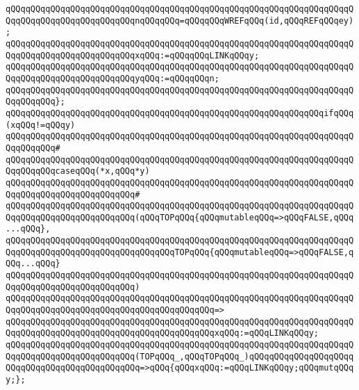 \verb|qQQqqQQqqQQqqQQqqQQqqQQqqQQqqQQqqQQqqQQqqQQqqQQqqQQqqQQqqQQqqQQqqQQqqQQqqQQqqQQqqQQqqQQqqQQqqQQqnqQQqqQQq=qQQqqQQqWREFqQQq(id,qQQqREFqQQqey);|\newline
\verb|qQQqqQQqqQQqqQQqqQQqqQQqqQQqqQQqqQQqqQQqqQQqqQQqqQQqqQQqqQQqqQQqqQQqqQQqqQQqqQQqqQQqqQQqqQQqqQQqxqQQq:=qQQqqQQqLINKqQQqy;|\newline
\verb|qQQqqQQqqQQqqQQqqQQqqQQqqQQqqQQqqQQqqQQqqQQqqQQqqQQqqQQqqQQqqQQqqQQqqQQqqQQqqQQqqQQqqQQqqQQqqQQqyqQQq:=qQQqqQQqn;|\newline
\verb|qQQqqQQqqQQqqQQqqQQqqQQqqQQqqQQqqQQqqQQqqQQqqQQqqQQqqQQqqQQqqQQqqQQqqQQqqQQqqQQq};|\newline
\newline
\verb|qQQqqQQqqQQqqQQqqQQqqQQqqQQqqQQqqQQqqQQqqQQqqQQqqQQqqQQqqQQqqQQqifqQQq(xqQQq!=qQQqy)|\newline
\verb|qQQqqQQqqQQqqQQqqQQqqQQqqQQqqQQqqQQqqQQqqQQqqQQqqQQqqQQqqQQqqQQqqQQqqQQqqQQqqQQq#|\newline
\verb|qQQqqQQqqQQqqQQqqQQqqQQqqQQqqQQqqQQqqQQqqQQqqQQqqQQqqQQqqQQqqQQqqQQqqQQqqQQqqQQqcaseqQQq(*x,qQQq*y)|\newline
\verb|qQQqqQQqqQQqqQQqqQQqqQQqqQQqqQQqqQQqqQQqqQQqqQQqqQQqqQQqqQQqqQQqqQQqqQQqqQQqqQQqqQQqqQQqqQQqqQQq#|\newline
\verb|qQQqqQQqqQQqqQQqqQQqqQQqqQQqqQQqqQQqqQQqqQQqqQQqqQQqqQQqqQQqqQQqqQQqqQQqqQQqqQQqqQQqqQQqqQQqqQQq(qQQqTOPqQQq{qQQqmutableqQQq=>qQQqFALSE,qQQq...qQQq},|\newline
\verb|qQQqqQQqqQQqqQQqqQQqqQQqqQQqqQQqqQQqqQQqqQQqqQQqqQQqqQQqqQQqqQQqqQQqqQQqqQQqqQQqqQQqqQQqqQQqqQQqqQQqqQQqTOPqQQq{qQQqmutableqQQq=>qQQqFALSE,qQQq...qQQq}|\newline
\verb|qQQqqQQqqQQqqQQqqQQqqQQqqQQqqQQqqQQqqQQqqQQqqQQqqQQqqQQqqQQqqQQqqQQqqQQqqQQqqQQqqQQqqQQqqQQqqQQq)|\newline
\verb|qQQqqQQqqQQqqQQqqQQqqQQqqQQqqQQqqQQqqQQqqQQqqQQqqQQqqQQqqQQqqQQqqQQqqQQqqQQqqQQqqQQqqQQqqQQqqQQqqQQqqQQqqQQqqQQq=>|\newline
\verb|qQQqqQQqqQQqqQQqqQQqqQQqqQQqqQQqqQQqqQQqqQQqqQQqqQQqqQQqqQQqqQQqqQQqqQQqqQQqqQQqqQQqqQQqqQQqqQQqqQQqqQQqqQQqqQQqxqQQq:=qQQqLINKqQQqy;|\newline
\newline
\verb|qQQqqQQqqQQqqQQqqQQqqQQqqQQqqQQqqQQqqQQqqQQqqQQqqQQqqQQqqQQqqQQqqQQqqQQqqQQqqQQqqQQqqQQqqQQqqQQq(TOPqQQq_,qQQqTOPqQQq_)qQQqqQQqqQQqqQQqqQQqqQQqqQQqqQQqqQQqqQQqqQQqqQQq=>qQQq{qQQqxqQQq:=qQQqLINKqQQqy;qQQqmutqQQqy;};|\newline
\newline
